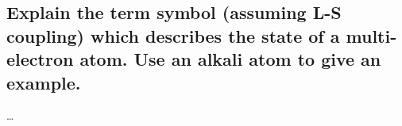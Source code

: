\subsection{Explain the term symbol (assuming L-S coupling) which describes the state of a multi-electron atom. Use an alkali atom to give an example.}


\ldots